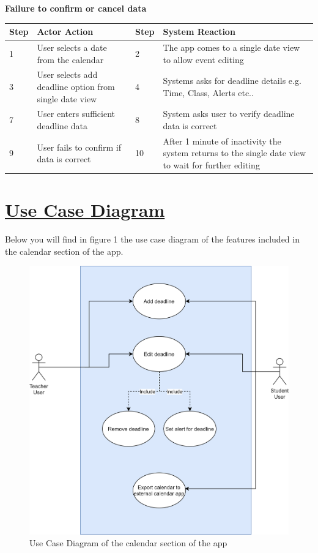 \documentclass[a4paper]{article}
\begin{document}
\noindent\textbf{Failure to confirm or cancel data}\\
\noindent\begin{tabular}{|m{0.7cm}|m{7.5cm}|m{0.7cm}|m{7.5cm}|}
	\hline
	\textbf{Step} & \textbf{Actor Action} & \textbf{Step} & \textbf{System Reaction} \\
	\hline
	1 & User selects a date from the calendar & 2 & The app comes to a single date view to allow event editing \\
	\hline
	3 & User selects add deadline option from single date view & 4 & Systems asks for deadline details e.g. Time, Class, Alerts etc..\\
	\hline
	7 & User enters sufficient deadline data & 8 & System asks user to verify deadline data is correct \\
	\hline
	9 & User fails to confirm if data is correct & 10 & After 1 minute of inactivity the system returns to the single date view to wait for further editing\\
	\hline

\end{tabular}

\section*{\underline{Use Case Diagram}}
Below you will find in figure 1 the use case diagram of the features included in the calendar section of the app.
\begin{figure}[h!]
	\includegraphics[scale=0.3]{UseCaseDiagram.png}
	\caption{Use Case Diagram of the calendar section of the app}
	\label{fig:Use Case Diagram}
\end{figure}


\pagebreak
\end{document}

